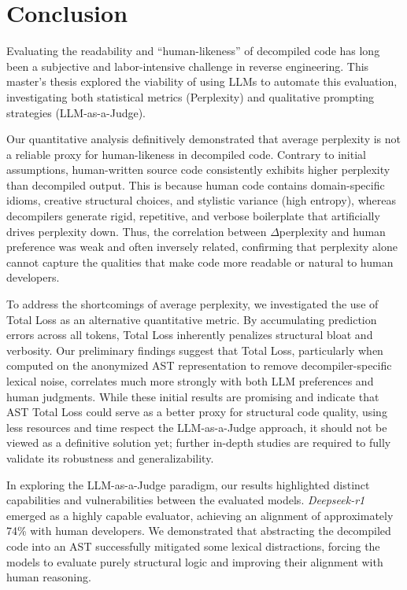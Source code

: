 \chapter{Conclusion}\label{ch:conclusion}

Evaluating the readability and ``human-likeness'' of decompiled code has long been a subjective and labor-intensive challenge in reverse engineering. This master's thesis explored the viability of using \acp{LLM} to automate this evaluation, investigating both statistical metrics (Perplexity) and qualitative prompting strategies (LLM-as-a-Judge).

Our quantitative analysis definitively demonstrated that average perplexity is not a reliable proxy for human-likeness in decompiled code. Contrary to initial assumptions, human-written source code consistently exhibits higher perplexity than decompiled output. This is because human code contains domain-specific idioms, creative structural choices, and stylistic variance (high entropy), whereas decompilers generate rigid, repetitive, and verbose boilerplate that artificially drives perplexity down. Thus, the correlation between $\Delta$perplexity and human preference was weak and often inversely related, confirming that perplexity alone cannot capture the qualities that make code more readable or natural to human developers.

To address the shortcomings of average perplexity, we investigated the use of Total Loss as an alternative quantitative metric. By accumulating prediction errors across all tokens, Total Loss inherently penalizes structural bloat and verbosity. Our preliminary findings suggest that Total Loss, particularly when computed on the anonymized \ac{AST} representation to remove decompiler-specific lexical noise, correlates much more strongly with both \ac{LLM} preferences and human judgments. While these initial results are promising and indicate that \ac{AST} Total Loss could serve as a better proxy for structural code quality, using less resources and time respect the LLM-as-a-Judge approach, it should not be viewed as a definitive solution yet; further in-depth studies are required to fully validate its robustness and generalizability.

In exploring the LLM-as-a-Judge paradigm, our results highlighted distinct capabilities and vulnerabilities between the evaluated models. \emph{Deepseek-r1} emerged as a highly capable evaluator, achieving an alignment of approximately 74\% with human developers. We demonstrated that abstracting the decompiled code into an \ac{AST} successfully mitigated some lexical distractions, forcing the models to evaluate purely structural logic and improving their alignment with human reasoning.

